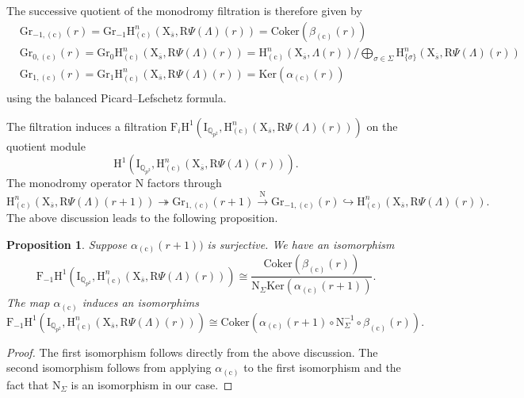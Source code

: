 \documentclass[10pt]{amsart}
\numberwithin{equation}{section}
\newtheorem{proposition}[equation]{Proposition}
\theoremstyle{definition}
\def\Ker{\mathrm{Ker}}
\def\Coker{\mathrm{Coker}}
\def\QQ{\mathbb{Q}}
\def\rmc{\mathrm{c}}
\def\rmH{\mathrm{H}}
\def\rmN{\mathrm{N}}
\def\rmR{\mathrm{R}}
\def\rmX{\mathrm{X}}
\begin{document}
The successive quotient of the monodromy filtration is therefore given by
\begin{equation}\label{mono-fil}
\begin{aligned}
&\mathrm{Gr}_{-1, (\rmc)}(r)=\mathrm{Gr}_{-1}\mathrm{H}^{n}_{(\rmc)}(\rmX_{\overline{s}}, \rmR\Psi(\Lambda)(r))= \Coker(\beta_{(\rmc)}(r))\\
&\mathrm{Gr}_{0, (\rmc)}(r)=\mathrm{Gr}_{0}\mathrm{H}^{n}_{(\rmc)}(\rmX_{\overline{s}}, \rmR\Psi(\Lambda)(r))= \mathrm{H}^{n}_{(\rmc)}(\rmX_{\overline{s}}, \Lambda(r))/\bigoplus\limits_{\sigma\in\Sigma}\rmH^{n}_{\{\sigma\}}(\rmX_{\overline{s}}, \rmR\Psi(\Lambda)(r))\\
&\mathrm{Gr}_{1, (\rmc)}(r)=\mathrm{Gr}_{1}\mathrm{H}^{n}_{(\rmc)}(\rmX_{\overline{s}}, \rmR\Psi(\Lambda)(r))=\Ker(\alpha_{(\rmc)}(r))\\
\end{aligned}
\end{equation}
using the balanced Picard--Lefschetz formula. 

The filtration induces a filtration $\mathrm{F}_{i}\mathrm{H}^{1}(\mathrm{I}_{\QQ_{p^{2}}}, \mathrm{H}^{n}_{(\rmc)}(\rmX_{\overline{s}}, \rmR\Psi(\Lambda)(r)))$ on the quotient module
\begin{equation*}
\mathrm{H}^{1}(\mathrm{I}_{\QQ_{p^{2}}}, \mathrm{H}^{n}_{(\rmc)}(\rmX_{\overline{s}}, \rmR\Psi(\Lambda)(r))). 
\end{equation*}
The monodromy operator $\mathrm{N}$ factors through 
\begin{equation*}
\mathrm{H}^{n}_{(\rmc)}(\rmX_{\overline{s}}, \rmR\Psi(\Lambda)(r+1))\twoheadrightarrow\mathrm{Gr}_{1, (\rmc)}(r+1)\xrightarrow{\mathrm{N}} \mathrm{Gr}_{-1, (\rmc)}(r) \hookrightarrow \mathrm{H}^{n}_{(\rmc)}(\rmX_{\overline{s}}, \rmR\Psi(\Lambda)(r)).
\end{equation*}
The above discussion leads to the following proposition.

\begin{proposition}\label{F-1}
Suppose $\alpha_{(\rmc)}(r+1))$ is  surjective. We have an isomorphism
\begin{equation*}
\mathrm{F}_{-1}\mathrm{H}^{1}(\mathrm{I}_{\QQ_{p^{2}}}, \mathrm{H}^{n}_{(\rmc)}(\rmX_{\overline{s}}, \rmR\Psi(\Lambda)(r)))\cong \frac{\Coker(\beta_{(\rmc)}(r))}{\mathrm{N}_{\Sigma}\Ker(\alpha_{(\rmc)}(r+1))}.
\end{equation*}
The map $\alpha_{(\rmc)}$ induces an isomorphims
\begin{equation*}
\mathrm{F}_{-1}\mathrm{H}^{1}(\mathrm{I}_{\QQ_{p^{2}}}, \mathrm{H}^{n}_{(\rmc)}(\rmX_{\overline{s}}, \rmR\Psi(\Lambda)(r)))\cong \Coker(\alpha_{(\rmc)}(r+1)\circ \rmN^{-1}_{\Sigma}\circ \beta_{(\rmc)}(r)).
\end{equation*}
\end{proposition}
\begin{proof}
The first isomorphism follows directly from the above discussion. The second isomorphism follows from applying $\alpha_{(\rmc)}$ to the first isomorphism and the fact that $\rmN_{\Sigma}$ is an isomorphism in our case. 
\end{proof}
\end{document}
